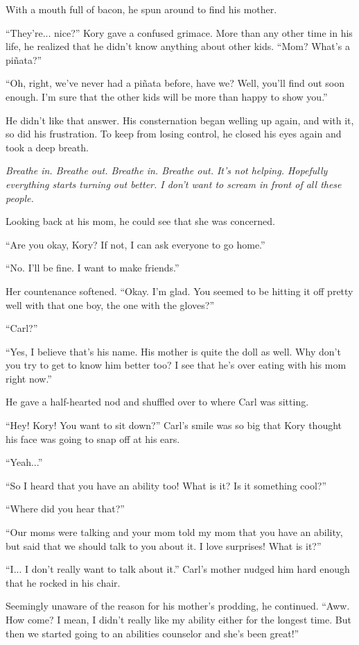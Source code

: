 With a mouth full of bacon, he spun around to find his mother.

``They're... nice?'' Kory gave a confused grimace. More than any other time in his life, he realized that he didn't know anything about other kids. ``Mom? What's a piñata?''

``Oh, right, we've never had a piñata before, have we? Well, you'll find out soon enough. I'm sure that the other kids will be more than happy to show you.''

He didn't like that answer. His consternation began welling up again, and with it, so did his frustration. To keep from losing control, he closed his eyes again and took a deep breath.

\textit{Breathe in. Breathe out. Breathe in. Breathe out. It's not helping. Hopefully everything starts turning out better. I don't want to scream in front of all these people.}

Looking back at his mom, he could see that she was concerned.

``Are you okay, Kory? If not, I can ask everyone to go home.''

``No. I'll be fine. I want to make friends.''

Her countenance softened. ``Okay. I'm glad. You seemed to be hitting it off pretty well with that one boy, the one with the gloves?''

``Carl?''

``Yes, I believe that's his name. His mother is quite the doll as well. Why don't you try to get to know him better too? I see that he's over eating with his mom right now.''

He gave a half-hearted nod and shuffled over to where Carl was sitting.

``Hey! Kory! You want to sit down?'' Carl's smile was so big that Kory thought his face was going to snap off at his ears.

``Yeah...''

``So I heard that you have an ability too! What is it? Is it something cool?''

``Where did you hear that?''

``Our moms were talking and your mom told my mom that you have an ability, but said that we should talk to you about it. I love surprises! What is it?''

``I... I don't really want to talk about it.'' Carl's mother nudged him hard enough that he rocked in his chair.

Seemingly unaware of the reason for his mother's prodding, he continued. ``Aww. How come? I mean, I didn't really like my ability either for the longest time. But then we started going to an abilities counselor and she's been great!''

